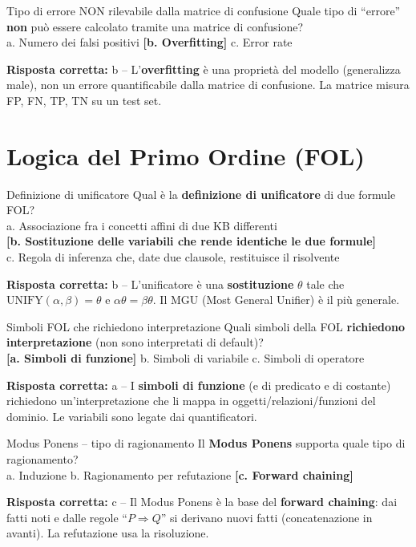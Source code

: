 \documentclass[12pt,a4paper]{article}
\newcommand{\corr}[1]{\textcolor{green!55!black}{\textbf{[#1]}}}
\newcommand{\risp}[1]{\begin{abox}\textbf{Risposta corretta: }#1\end{abox}}
\begin{document}
\bigskip
\begin{qbox}{Tipo di errore NON rilevabile dalla matrice di confusione}
Quale tipo di ``errore'' \textbf{non} può essere calcolato tramite una matrice di confusione?
\\[4pt]
a. Numero dei falsi positivi \quad \corr{b. Overfitting} \quad c. Error rate
\end{qbox}
\risp{b -- L'\textbf{overfitting} è una proprietà del modello (generalizza male), non un errore quantificabile dalla matrice di confusione. La matrice misura FP, FN, TP, TN su un test set.}

\section{Logica del Primo Ordine (FOL)}

\begin{qbox}{Definizione di unificatore}
Qual è la \textbf{definizione di unificatore} di due formule FOL?
\\[4pt]
a. Associazione fra i concetti affini di due KB differenti\\
\corr{b. Sostituzione delle variabili che rende identiche le due formule}\\
c. Regola di inferenza che, date due clausole, restituisce il risolvente
\end{qbox}
\risp{b -- L'unificatore è una \textbf{sostituzione} $\theta$ tale che $\text{UNIFY}(\alpha, \beta) = \theta$ e $\alpha\theta = \beta\theta$. Il MGU (Most General Unifier) è il più generale.}

\bigskip
\begin{qbox}{Simboli FOL che richiedono interpretazione}
Quali simboli della FOL \textbf{richiedono interpretazione} (non sono interpretati di default)?
\\[4pt]
\corr{a. Simboli di funzione} \quad b. Simboli di variabile \quad c. Simboli di operatore
\end{qbox}
\risp{a -- I \textbf{simboli di funzione} (e di predicato e di costante) richiedono un'interpretazione che li mappa in oggetti/relazioni/funzioni del dominio. Le variabili sono legate dai quantificatori.}

\bigskip
\begin{qbox}{Modus Ponens -- tipo di ragionamento}
Il \textbf{Modus Ponens} supporta quale tipo di ragionamento?
\\[4pt]
a. Induzione \quad b. Ragionamento per refutazione \quad \corr{c. Forward chaining}
\end{qbox}
\risp{c -- Il Modus Ponens è la base del \textbf{forward chaining}: dai fatti noti e dalle regole ``$P \Rightarrow Q$'' si derivano nuovi fatti (concatenazione in avanti). La refutazione usa la risoluzione.}
\end{document}
